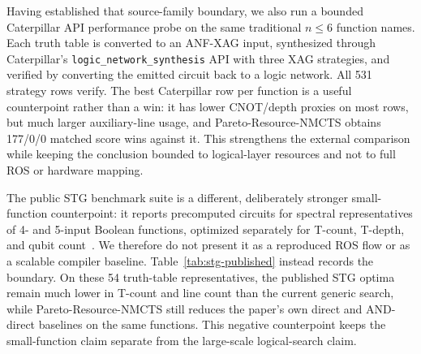 \documentclass[11pt]{article}
\newcommand{\method}{Resource-NMCTS}
\begin{document}
\begin{table}[H]
\centering
\scriptsize
\setlength{\tabcolsep}{3pt}
\caption{Caterpillar ROS-family source probe.  This is a local source/API/build
and toy compile smoke audit for a related open-source synthesis library; it is
not a full ROS SAT garbage-management reproduction, and this source-only audit
is not itself a standalone performance baseline.}
\label{tab:caterpillar-ros-family}

\end{table}

Having established that source-family boundary, we also run a bounded
Caterpillar API performance probe on the same traditional $n\leq6$ function
names.  Each truth table is converted to an ANF-XAG input, synthesized through
Caterpillar's \texttt{logic\_network\_synthesis} API with three XAG strategies,
and verified by converting the emitted circuit back to a logic network.  All
531 strategy rows verify.  The best Caterpillar row per function is a useful
counterpoint rather than a win: it has lower CNOT/depth proxies on most rows,
but much larger auxiliary-line usage, and Pareto-\method{} obtains 177/0/0
matched score wins against it.  This strengthens the external comparison while
keeping the conclusion bounded to logical-layer resources and not to full ROS
or hardware mapping.

\begin{table}[H]
\centering
\scriptsize
\setlength{\tabcolsep}{3pt}
\caption{Caterpillar XAG API performance probe on the traditional $n\leq6$
slice.  The probe uses ANF-XAG inputs and Caterpillar's logic-network API; it is
a verified implementation-family counterpoint, not the official ROS flow.}
\label{tab:caterpillar-xag-api}

\end{table}

The public STG benchmark suite is a different, deliberately stronger
small-function counterpoint: it reports precomputed circuits for spectral
representatives of 4- and 5-input Boolean functions, optimized separately for
T-count, T-depth, and qubit count~\cite{stgBenchmark}.  We therefore do not
present it as a reproduced ROS flow or as a scalable compiler baseline.
Table~\ref{tab:stg-published} instead records the boundary.  On these 54
truth-table representatives, the published STG optima remain much lower in
T-count and line count than the current generic search, while
Pareto-\method{} still reduces the paper's own direct and AND-direct baselines
on the same functions.  This negative counterpoint keeps the small-function
claim separate from the large-scale logical-search claim.
\end{document}
